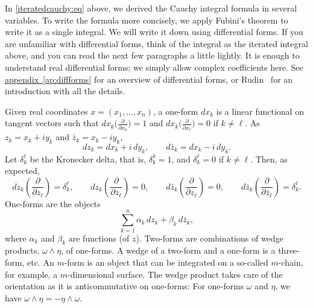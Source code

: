 \documentclass[12pt,openany]{book}
\theoremstyle{plain}
\theoremstyle{remark}
\theoremstyle{definition}
\theoremstyle{exercise}
\theoremstyle{example}
\newcommand{\appendixref}[1]{\hyperref[#1]{appendix~\ref*{#1}}}
\begin{document}
In \eqref{iteratedcauchy:eq} above,
we derived the Cauchy integral formula in several variables.  To
write the formula more concisely, we apply Fubini's theorem to write it as
a single integral.  We will write it down using differential forms.  If you
are unfamiliar with differential forms, think of the integral
as the iterated integral above, and you can read the next few paragraphs
a little lightly.
It is enough to understand real differential forms; we simply allow
complex coefficients here.
See \appendixref{ap:diffforms} for an overview of differential forms,
or
Rudin~\cite{Rudin:principles} for an introduction with all the details.

Given real coordinates $x = (x_1,\ldots,x_n)$, a one-form $d x_k$ is a linear functional on tangent vectors
such that $d x_k \bigl( \frac{\partial}{\partial x_k} \bigr) = 1$ and
$d x_k \bigl( \frac{\partial}{\partial x_{\ell}} \bigr) = 0$ if $k \not=
{\ell}$.
As $z_k = x_k + i y_k$ and
$\bar{z}_k = x_k - i y_k$,
%
\begin{equation*}
d z_k = d x_k + i \, d y_k ,
\qquad
d \bar{z}_k = d x_k - i \, d y_k .
\end{equation*}
Let
%
$\delta_{k}^{\ell}$ be the Kronecker delta, that is, $\delta_k^k = 1$,
and $\delta_k^{\ell} = 0$ if $k \not= {\ell}$.  Then, as expected,
\begin{equation*}
d z_k \left( \frac{\partial}{\partial z_{\ell}} \right) = \delta_k^{\ell} ,
\qquad
d z_k \left( \frac{\partial}{\partial \bar{z}_{\ell}} \right) = 0 ,
\qquad
d \bar{z}_k \left( \frac{\partial}{\partial z_{\ell}} \right) = 0 ,
\qquad
d \bar{z}_k \left( \frac{\partial}{\partial \bar{z}_{\ell}} \right) =
\delta_k^{\ell}
.
\end{equation*}
One-forms are the objects
\begin{equation*}
\sum_{k=1}^n \alpha_k \, d z_k +
\beta_k \, d \bar{z}_k ,
\end{equation*}
where $\alpha_k$ and $\beta_k$ are functions (of $z$).
Two-forms are combinations of wedge products,
$\omega \wedge \eta$, of one-forms.  A wedge of a two-form and
a one-form is a three-form, etc.
An $m$-form is an object that
can be integrated on a so-called $m$-chain, for example, a
$m$-dimensional surface.  The wedge product takes care of the orientation
as it is anticommutative on one-forms:
For one-forms $\omega$ and $\eta$, we have
$\omega \wedge \eta = - \eta \wedge \omega$.
\end{document}
